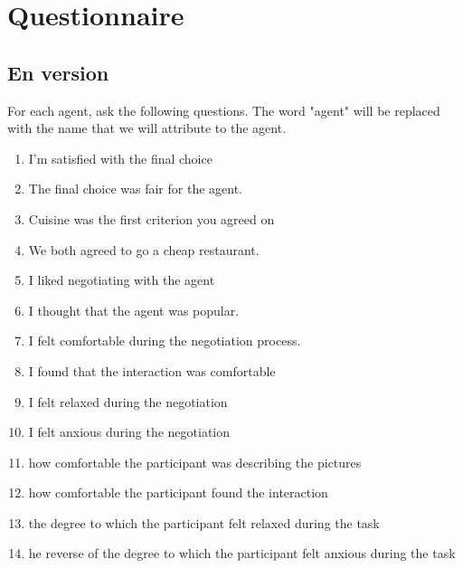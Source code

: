 \documentclass [french]{paper}
\begin{document}
		\section{Questionnaire}
		
			\subsection{En version}
			For each agent, ask the following questions. The word "agent" will be replaced with the name that we will attribute to the agent.
			\begin{enumerate}
				\item I'm satisfied with the final choice
				\item The final choice was fair for the agent.
				\item Cuisine was the first criterion you agreed on 
				\item  We both agreed to go a cheap restaurant.
				
				
				\item I liked negotiating with the agent
				\item I thought that the agent was popular.
				
				\item I felt comfortable during the negotiation process.
				\item I found that the interaction was comfortable
				\item I felt relaxed during the negotiation
				\item I felt anxious during the negotiation
				
				
				
				
				\item how comfortable the participant was describing the pictures
				\item how comfortable the participant found the interaction
				\item the degree to which the participant felt relaxed during the task
				\item he reverse of the degree to which the participant	felt anxious during the task
				



\end{enumerate}
\end{document}
